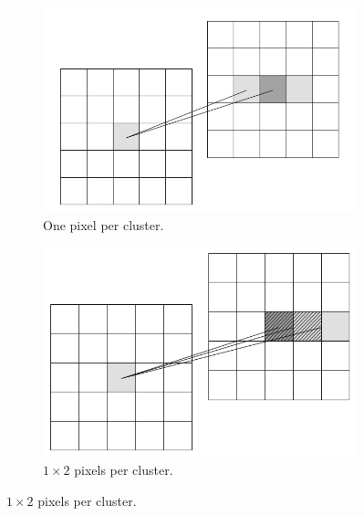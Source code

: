    \begin{figure}[!h]
     \centering
      \begin{subfigure}[t]{0.45\textwidth}
         \centering
         \includegraphics[width = \textwidth]{Pictures/deformation/cluster_1x1.png}
         \caption{One pixel per cluster.}
      \end{subfigure}
      \quad
      \begin{subfigure}[t]{0.45\textwidth}
        \centering
        \includegraphics[width = \textwidth]{Pictures/deformation/cluster_1x2.png}
        \caption{$1 \times 2$ pixels per cluster.}
      \end{subfigure}
      

\end{figure}
